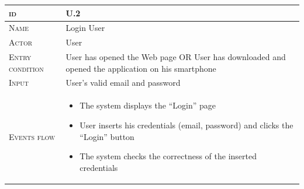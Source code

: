 \begin{table}[H]
    \centering
    \begin{tabular}[c]{|l|p{}|}
        \hline %
    	\textsc{id}                 &   U.2\\
    	\hline %
    	\textsc{Name}               &   Login User\\
    	\hline %
    	\textsc{Actor}             &   User\\
    	\hline %
    	\textsc{Entry condition}   &   User has opened the Web page OR User has downloaded and opened the application on his smartphone\\
    	\hline %
    	\textsc{Input}   &   User’s valid email and password\\
    	\hline %
    	\textsc{Events flow}         &   %
            	                        \begin{itemize}
                                    	    \item The system displays the “Login” page
                                            \item User inserts his credentials (email, password) and clicks the “Login” button
                                            \item The system checks the correctness of the inserted credentials



\end{itemize}
\end{tabular}
\end{table}
